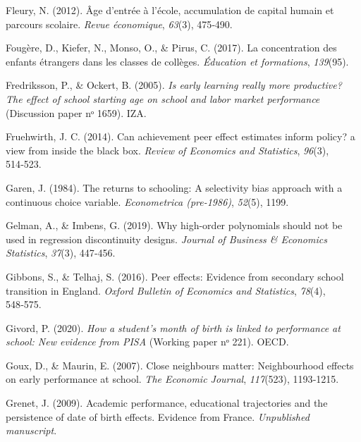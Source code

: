 \documentclass[
]{book}
\newlength{\cslhangindent}
\newlength{\cslentryspacingunit} %
\newenvironment{CSLReferences}[2] %
 {%
  \setlength{\parindent}{0pt}
  \ifodd #1
  \let\oldpar\par
  \def\par{\hangindent=\cslhangindent\oldpar}
  \fi
  \setlength{\parskip}{#2\cslentryspacingunit}
 }%
 {}
\begin{document}
\begin{CSLReferences}{1}{2}
\leavevmode{}%
Fleury, N. (2012). {Â}ge d'entr{é}e {à} l'{é}cole, accumulation de capital humain et parcours scolaire. \emph{Revue {é}conomique}, \emph{63}(3), 475‑490.

\leavevmode{}%
Fougère, D., Kiefer, N., Monso, O., \& Pirus, C. (2017). La concentration des enfants {é}trangers dans les classes de coll{è}ges. \emph{Éducation et formations}, \emph{139}(95).

\leavevmode{}%
Fredriksson, P., \& Ockert, B. (2005). \emph{Is early learning really more productive? The effect of school starting age on school and labor market performance} (Discussion paper nᵒ 1659). IZA.

\leavevmode{}%
Fruehwirth, J. C. (2014). Can achievement peer effect estimates inform policy? a view from inside the black box. \emph{Review of Economics and Statistics}, \emph{96}(3), 514‑523.

\leavevmode{}%
Garen, J. (1984). The returns to schooling: A selectivity bias approach with a continuous choice variable. \emph{Econometrica (pre-1986)}, \emph{52}(5), 1199.

\leavevmode{}%
Gelman, A., \& Imbens, G. (2019). Why high-order polynomials should not be used in regression discontinuity designs. \emph{Journal of Business \& Economics Statistics}, \emph{37}(3), 447‑456.

\leavevmode{}%
Gibbons, S., \& Telhaj, S. (2016). Peer effects: Evidence from secondary school transition in England. \emph{Oxford Bulletin of Economics and Statistics}, \emph{78}(4), 548‑575.

\leavevmode{}%
Givord, P. (2020). \emph{How a student's month of birth is linked to performance at school: New evidence from PISA} (Working paper nᵒ 221). OECD.

\leavevmode{}%
Goux, D., \& Maurin, E. (2007). Close neighbours matter: Neighbourhood effects on early performance at school. \emph{The Economic Journal}, \emph{117}(523), 1193‑1215.

\leavevmode{}%
Grenet, J. (2009). Academic performance, educational trajectories and the persistence of date of birth effects. Evidence from France. \emph{Unpublished manuscript}.


\end{CSLReferences}
\end{document}
